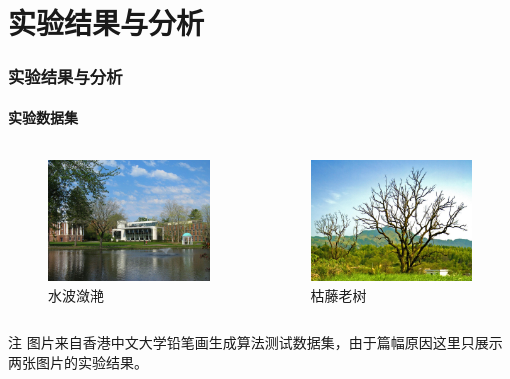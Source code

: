 \documentclass[aspectratio=43, xcolor=svgnames, t, 10pt]{beamer}
\begin{document}
\section{实验结果与分析}
\begin{frame}
  \frametitle{实验结果与分析}
  \framesubtitle{实验数据集}
  \begin{columns}
    \begin{column}{0.5\linewidth}
      \begin{figure}
        \includegraphics[width=\linewidth]{./figure/test-01.jpg}
        \caption{水波潋滟}
      \end{figure}
    \end{column}
    \begin{column}{0.5\linewidth}
      \begin{figure}
        \includegraphics[width=\linewidth]{./figure/test-03.jpg}
        \caption{枯藤老树}
      \end{figure}
    \end{column}
  \end{columns}
  \begin{block}{注}
    图片来自香港中文大学铅笔画生成算法测试数据集，由于篇幅原因这里只展示两张图片的实验结果。
  \end{block}
\end{frame}
\end{document}
